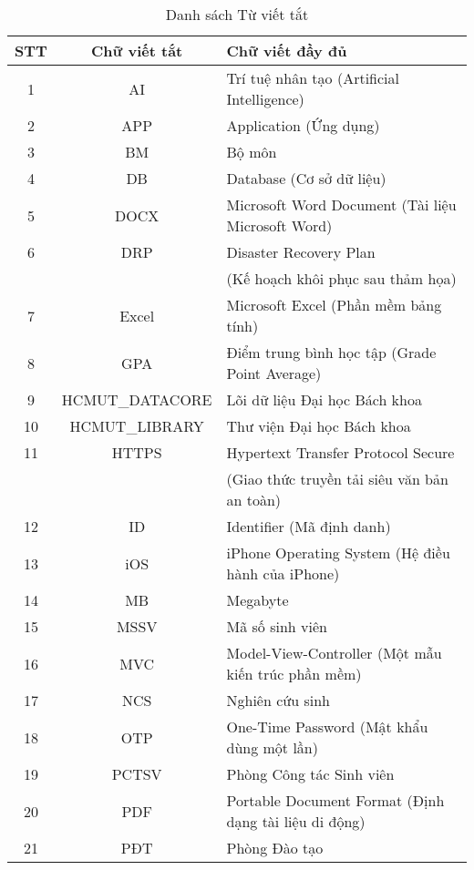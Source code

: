 \begin{table}[h!]
\centering
\caption{Danh sách Từ viết tắt}
\begin{tabular}{|c|c|l|}
\hline
\textbf{STT} & \textbf{Chữ viết tắt} & \textbf{Chữ viết đầy đủ} \\ \hline
1 & AI & Trí tuệ nhân tạo (Artificial Intelligence) \\ 
\hline
2 & APP & Application (Ứng dụng) \\ 
\hline
3 & BM & Bộ môn \\
\hline
4 & DB & Database (Cơ sở dữ liệu) \\ 
\hline
5 & DOCX & Microsoft Word Document (Tài liệu Microsoft Word) \\ 
\hline
6 & \multicolumn{1}{c|}{DRP} & \multicolumn{1}{l|}{Disaster Recovery Plan} \\ 
    & \multicolumn{1}{c|}{}     & \multicolumn{1}{l|}{(Kế hoạch khôi phục sau thảm họa)} \\ 
\hline
7 & Excel & Microsoft Excel (Phần mềm bảng tính) \\
\hline
8 & GPA & Điểm trung bình học tập (Grade Point Average) \\ 
\hline
9 & HCMUT\_DATACORE & Lõi dữ liệu Đại học Bách khoa \\ 
\hline
10 & HCMUT\_LIBRARY & Thư viện Đại học Bách khoa \\ 
\hline
11 & \multicolumn{1}{c|}{HTTPS} & \multicolumn{1}{l|}{Hypertext Transfer Protocol Secure} \\ 
    & \multicolumn{1}{c|}{}     & \multicolumn{1}{l|}{(Giao thức truyền tải siêu văn bản an toàn)} \\ 
\hline
12 & ID & Identifier (Mã định danh) \\ 
\hline
13 & iOS & iPhone Operating System (Hệ điều hành của iPhone) \\ 
\hline
14 & MB & Megabyte \\
\hline
15 & MSSV & Mã số sinh viên \\ 
\hline
16 & MVC & Model-View-Controller (Một mẫu kiến trúc phần mềm) \\ 
\hline
17 & NCS & Nghiên cứu sinh \\ 
\hline
18 & OTP & One-Time Password (Mật khẩu dùng một lần) \\ 
\hline
19 & PCTSV & Phòng Công tác Sinh viên \\ 
\hline
20 & PDF & Portable Document Format (Định dạng tài liệu di động) \\ 
\hline
21 & PĐT & Phòng Đào tạo \\ 

\end{tabular}
\end{table}
